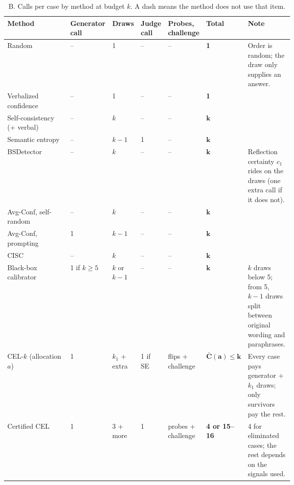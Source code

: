 \documentclass[10pt]{article}
\begin{document}
\newpage
\begin{table}[h]
\centering
\small
\caption{B. Calls per case by method at budget $k$. A dash means the method does not use that item.}
\begin{tabularx}{\linewidth}{@{}p{0.22\linewidth}C{0.09\linewidth}C{0.09\linewidth}C{0.09\linewidth}C{0.10\linewidth}C{0.09\linewidth}Y@{}}
\toprule
Method & Generator call & Draws & Judge call & Probes, challenge & \textbf{Total} & Note \\
\midrule
Random & -- & 1 & -- & -- & \textbf{1} & Order is random; the draw only supplies an answer. \\
Verbalized confidence & -- & 1 & -- & -- & \textbf{1} & \\
Self-consistency (+ verbal) & -- & $k$ & -- & -- & $\boldsymbol{k}$ & \\
Semantic entropy & -- & $k-1$ & 1 & -- & $\boldsymbol{k}$ & \\
BSDetector & -- & $k$ & -- & -- & $\boldsymbol{k}$ & Reflection certainty $c_1$ rides on the draws (one extra call if it does not). \\
Avg-Conf, self-random & -- & $k$ & -- & -- & $\boldsymbol{k}$ & \\
Avg-Conf, prompting & 1 & $k-1$ & -- & -- & $\boldsymbol{k}$ & \\
CISC & -- & $k$ & -- & -- & $\boldsymbol{k}$ & \\
Black-box calibrator & 1 if $k\ge5$ & $k$ or $k-1$ & -- & -- & $\boldsymbol{k}$ & $k$ draws below 5; from 5, $k-1$ draws split between original wording and paraphrases. \\
\midrule
CEL-$k$ (allocation $a$) & 1 & $k_1$ + extra & 1 if SE & flips + challenge & $\boldsymbol{\bar C(a)\le k}$ & Every case pays generator + $k_1$ draws; only survivors pay the rest. \\
Certified CEL & 1 & 3 + more & 1 & probes + challenge & \textbf{4 or 15--16} & 4 for eliminated cases; the rest depends on the signals used. \\
\bottomrule
\end{tabularx}
\end{table}
\end{document}

